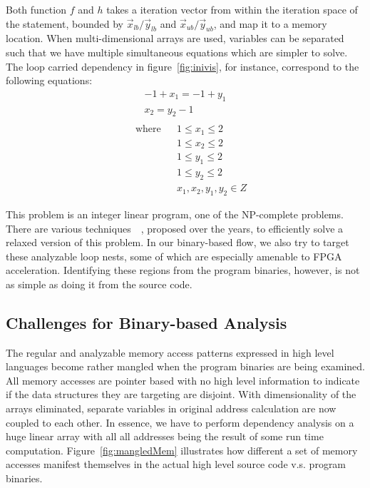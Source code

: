 Both function $f$ and $h$ takes a iteration vector from within the iteration space of the statement, bounded by $\vec{x}_{lb}/\vec{y}_{lb}$ and $\vec{x}_{ub}/\vec{y}_{ub}$, and map it to a memory location. When
multi-dimensional arrays are used, variables can be separated such that
we have multiple simultaneous equations which are simpler to solve.
The loop carried dependency in figure~\ref{fig:inivis}, for instance, correspond to the following equations:
\begin{equation*}
\begin{aligned}
-1+x_1 = -1+y_1 \\
x_2 = y_2-1 \\ 
\end{aligned}
\end{equation*}
\begin{equation*}
\begin{aligned}
& \text{ where}  & & 1 \le x_1 \le 2 \\
& & & 1 \le x_2 \le 2 \\
& & & 1 \le y_1 \le 2 \\
& & & 1 \le y_2 \le 2 \\
& & & x_1,x_2,y_1,y_2 \in Z
\end{aligned}
\end{equation*}


This problem is an integer linear program, one of the NP-complete problems.  
There are various techniques~\cite{banerjee}~\cite{gcd}, proposed over the years, to efficiently solve a relaxed version of this problem. 
In our binary-based flow, we also try to target these analyzable loop nests, some of which are especially amenable to FPGA acceleration. 
Identifying these regions from the program binaries, however, is not as
simple as doing it from the source code.




\subsection{Challenges for Binary-based Analysis}
\label{sec:cfbba}
The regular and analyzable memory access patterns expressed in high
level languages become rather mangled when the program binaries are 
being examined. All memory accesses are pointer based with no high
level information to indicate if the data structures they are targeting
are disjoint. With dimensionality of the arrays eliminated, 
separate variables in original address calculation are now coupled to each other. In essence, we have to perform dependency analysis on a huge linear
array with all all addresses being the result of some run time computation.
Figure~\ref{fig:mangledMem} illustrates how different a
set of memory accesses manifest themselves in the actual high level source code v.s. program binaries.

